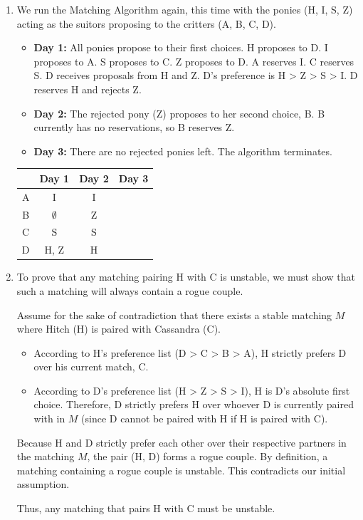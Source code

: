 \documentclass[11pt]{article}
\begin{document}
\begin{enumerate}[label=\textbf{(\alph*)}]
    \item We run the Matching Algorithm again, this time with the ponies (H, I, S, Z) acting as the suitors proposing to the critters (A, B, C, D).
    
    \begin{itemize}
        \item \textbf{Day 1:} All ponies propose to their first choices. H proposes to D. I proposes to A. S proposes to C. Z proposes to D. A reserves I. C reserves S. D receives proposals from H and Z. D's preference is H > Z > S > I. D reserves H and rejects Z.
        \item \textbf{Day 2:} The rejected pony (Z) proposes to her second choice, B. B currently has no reservations, so B reserves Z.
        \item \textbf{Day 3:} There are no rejected ponies left. The algorithm terminates.
    \end{itemize}

    \begin{center}
    \renewcommand{\arraystretch}{1.5}
    \begin{tabular}{|c||c|c|c|}
    \hline
     & Day 1 & Day 2 & Day 3 \\
    \hline\hline
    A & $\boxed{\text{I}}$ & $\boxed{\text{I}}$ & \\
    \hline
    B & $\emptyset$ & $\boxed{\text{Z}}$ & \\
    \hline
    C & $\boxed{\text{S}}$ & $\boxed{\text{S}}$ & \\
    \hline
    D & $\boxed{\text{H}}$, Z & $\boxed{\text{H}}$ & \\
    \hline
    \end{tabular}
    \end{center}

    \item To prove that any matching pairing H with C is unstable, we must show that such a matching will always contain a rogue couple. 
    
    Assume for the sake of contradiction that there exists a stable matching $M$ where Hitch (H) is paired with Cassandra (C).
    
    \begin{itemize}
        \item According to H's preference list (D > C > B > A), H strictly prefers D over his current match, C.
        \item According to D's preference list (H > Z > S > I), H is D's absolute first choice. Therefore, D strictly prefers H over whoever D is currently paired with in $M$ (since D cannot be paired with H if H is paired with C).
    \end{itemize}
    
    Because H and D strictly prefer each other over their respective partners in the matching $M$, the pair (H, D) forms a rogue couple. By definition, a matching containing a rogue couple is unstable. This contradicts our initial assumption. 
    
    Thus, any matching that pairs H with C must be unstable.
\end{enumerate}
\end{document}
